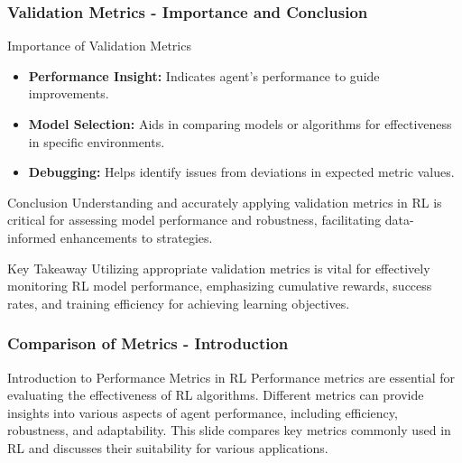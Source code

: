 \documentclass[aspectratio=169]{beamer}
\begin{document}
\begin{frame}[fragile]
    \frametitle{Validation Metrics - Importance and Conclusion}
    \begin{block}{Importance of Validation Metrics}
        \begin{itemize}
            \item \textbf{Performance Insight:} Indicates agent's performance to guide improvements.
            \item \textbf{Model Selection:} Aids in comparing models or algorithms for effectiveness in specific environments.
            \item \textbf{Debugging:} Helps identify issues from deviations in expected metric values.
        \end{itemize}
    \end{block}

    \begin{block}{Conclusion}
        Understanding and accurately applying validation metrics in RL is critical for assessing model performance and robustness, facilitating data-informed enhancements to strategies.
    \end{block}
    
    \begin{block}{Key Takeaway}
        Utilizing appropriate validation metrics is vital for effectively monitoring RL model performance, emphasizing cumulative rewards, success rates, and training efficiency for achieving learning objectives.
    \end{block}
\end{frame}

\begin{frame}[fragile]
    \frametitle{Comparison of Metrics - Introduction}
    \begin{block}{Introduction to Performance Metrics in RL}
        Performance metrics are essential for evaluating the effectiveness of RL algorithms. 
        Different metrics can provide insights into various aspects of agent performance, 
        including efficiency, robustness, and adaptability. 
        This slide compares key metrics commonly used in RL and discusses their suitability for various applications.
    \end{block}
\end{frame}
\end{document}
